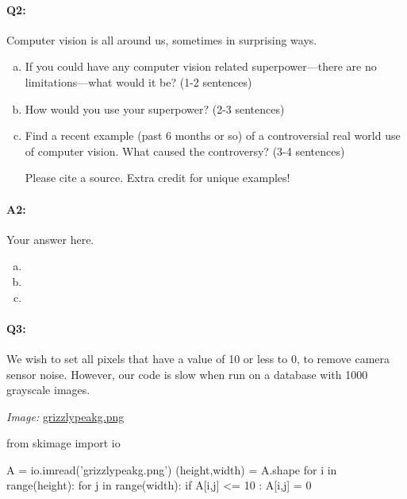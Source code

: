 \documentclass[11pt]{article}
\begin{document}
\paragraph{Q2:}
Computer vision is all around us, sometimes in surprising ways.
\begin{enumerate}[(a)]

\item
If you could have any computer vision related superpower---there are no limitations---what would it be? (1-2 sentences)

\item
How would you use your superpower? (2-3 sentences)

\item Find a recent example (past 6 months or so) of a controversial real world use of computer vision. What caused the controversy? (3-4 sentences)

Please cite a source. Extra credit for unique examples!
\end{enumerate}

\paragraph{A2:} Your answer here.

\begin{enumerate}[(a)]

\item

\item

\item

\end{enumerate}



\pagebreak
\paragraph{Q3:} We wish to set all pixels that have a value of 10 or less to 0, to remove camera sensor noise. However, our code is slow when run on a database with 1000 grayscale images.

\emph{Image:} \href{grizzlypeakg.png}{grizzlypeakg.png}

\begin{python}
from skimage import io

A = io.imread('grizzlypeakg.png')
(height,width) = A.shape
for i in range(height):
    for j in range(width):
        if A[i,j] <= 10 :
            A[i,j] = 0
\end{python}
\end{document}
